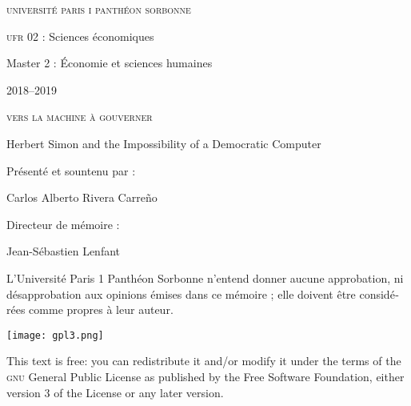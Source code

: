 \documentclass[version=last,draft=false,paper=A4,portrait,twoside=true,twocolumn=true,headinclude=false,footinclude=false,fontsize=12,BCOR=20mm,DIV=13,pagesize=auto,titlepage=firstiscover,mpinclude=false,open=right,chapterprefix=true,numbers=autoendperiod,headsepline=false,parskip=false]{scrbook}
\author{Carlos Alberto Rivera Carreño}
\date{}
\title{}
\begin{document}
\begin{titlepage}
 \centering
\begin{french}
 {\large \textsc{université paris i panthéon sorbonne} \par}
  \vspace*{0.01\textheight}
 {\large \textsc{ufr} 02 : Sciences économiques  \par}
  \vspace*{0.01\textheight}
 {\large Master 2 : Économie et sciences humaines \par}
  \vspace*{0.01\textheight}
 {\large 2018--2019 \par}
\end{french}
  \vspace*{0.3\textheight}
 {\huge \textsc{vers la machine à gouverner}  \par}
  \vspace*{0.02\textheight}
 {\Large Herbert Simon and the Impossibility of a Democratic Computer \par}
\vfill
\begin{french}
 {\large Présenté et sountenu par : \par}
\end{french}
 {\Large Carlos Alberto Rivera Carreño \par}
  \vspace*{0.05\textheight}
\begin{french}
 {\large Directeur de mémoire : \par}
\end{french}
 {\Large Jean-Sébastien Lenfant \par}
\end{titlepage}

\pagestyle{empty}

\begin{french}
L'Université Paris 1 Panthéon Sorbonne n'entend donner aucune approbation,
ni désapprobation aux opinions émises dans ce mémoire ; elle doivent être
considérées comme propres à leur auteur. 
\end{french}
\vfill

\newpage
\vspace*{\fill}
\noindent
\texttt{[image: gpl3.png]}\par
\vspace{1\baselineskip}
This text is free: you can redistribute it and/or modify it
under the terms of the \textsc{gnu} General Public License as published by
the Free Software Foundation, either version 3 of the License or any later
version.
\end{document}
